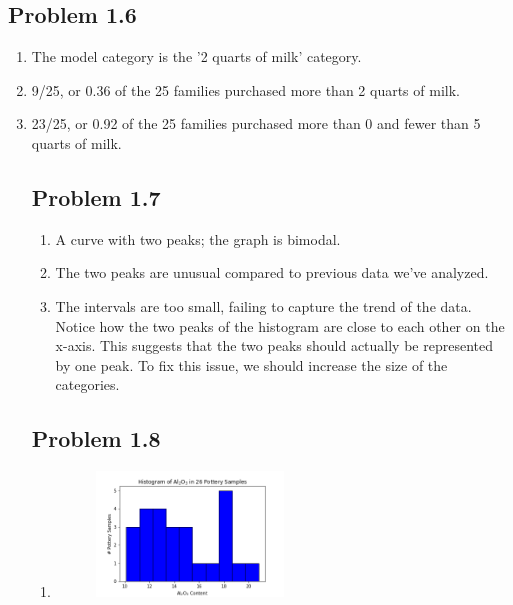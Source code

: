 \documentclass[12pt]{article}
\begin{document}
\subsection*{Problem 1.6}
    \begin{enumerate}[label=(\alph*).]
        \item The model category is the '2 quarts of milk' category.
        
        \item 9/25, or 0.36 of the 25 families purchased more than 2 quarts of milk.
        
        \item 23/25, or 0.92 of the 25 families purchased more than 0 and fewer than 5 quarts of milk.

\subsection*{Problem 1.7}
    \begin{enumerate}[label=(\alph*).]
        \item A curve with two peaks; the graph is bimodal.
        
        \item The two peaks are unusual compared to previous data we've analyzed.
        
        \item The intervals are too small, failing to capture the trend of the data. \\
        
        Notice how the two peaks of the histogram are close to each other on the x-axis. This suggests that the two peaks should actually be represented by one peak. To fix this issue, we should increase the size of the categories.
    \end{enumerate}
    
\subsection*{Problem 1.8}
    \begin{enumerate}[label=(\alph*).]
        \item
        \begin{figure}[H]
        \centering
        \includegraphics[width=0.5\textwidth]{1_8_a.png}
        \end{figure}
        

\end{enumerate}
\end{enumerate}
\end{document}
